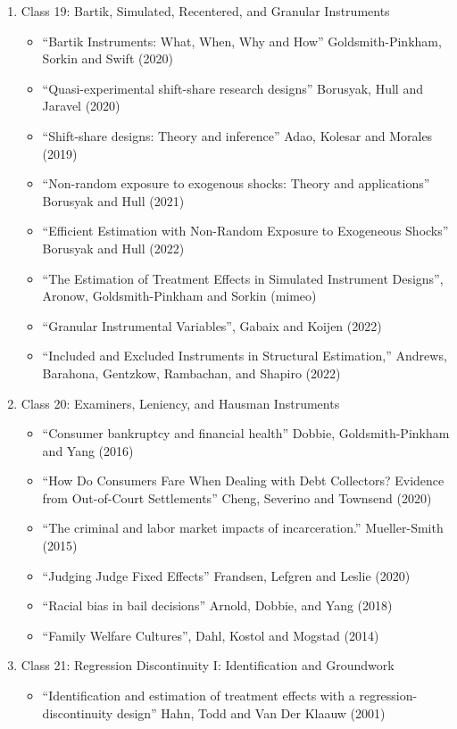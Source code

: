 \documentclass[11pt, a4paper]{article}
\begin{document}
\begin{enumerate}
\begin{enumerate}
  \item Class 19: Bartik, Simulated, Recentered, and Granular Instruments
    \begin{itemize}
    \item ``Bartik Instruments: What, When, Why and How'' Goldsmith-Pinkham, Sorkin and Swift (2020)
    \item ``Quasi-experimental shift-share research designs'' Borusyak, Hull and Jaravel (2020)
    \item ``Shift-share designs: Theory and inference'' Adao, Kolesar and Morales (2019)
    \item ``Non-random exposure to exogenous shocks: Theory and applications'' Borusyak and Hull (2021)
    \item ``Efficient Estimation with Non-Random Exposure to Exogeneous Shocks'' Borusyak and Hull (2022)
    \item ``The Estimation of Treatment Effects in Simulated Instrument Designs'', Aronow, Goldsmith-Pinkham and Sorkin (mimeo)
    \item ``Granular Instrumental Variables'', Gabaix and Koijen (2022)
    \item ``Included and Excluded Instruments in Structural Estimation,'' Andrews, Barahona, Gentzkow, Rambachan, and Shapiro (2022)
    \end{itemize}
  \item Class 20: Examiners, Leniency, and Hausman Instruments
    \begin{itemize}
    \item ``Consumer bankruptcy and financial health'' Dobbie, Goldsmith-Pinkham and Yang (2016)
    \item ``How Do Consumers Fare When Dealing with Debt Collectors? Evidence from Out-of-Court Settlements'' Cheng, Severino and Townsend (2020)
    \item ``The criminal and labor market impacts of incarceration.'' Mueller-Smith (2015)
    \item ``Judging Judge Fixed Effects'' Frandsen, Lefgren and Leslie (2020)
    \item ``Racial bias in bail decisions'' Arnold, Dobbie, and Yang (2018)
    \item ``Family Welfare Cultures'', Dahl, Kostol and Mogstad (2014)
    \end{itemize}
  \item Class 21: Regression Discontinuity I: Identification and Groundwork
    \begin{itemize}
    \item ``Identification and estimation of treatment effects with a regression-discontinuity design'' Hahn, Todd and Van Der Klaauw (2001)

\end{itemize}
\end{enumerate}
\end{enumerate}
\end{document}
